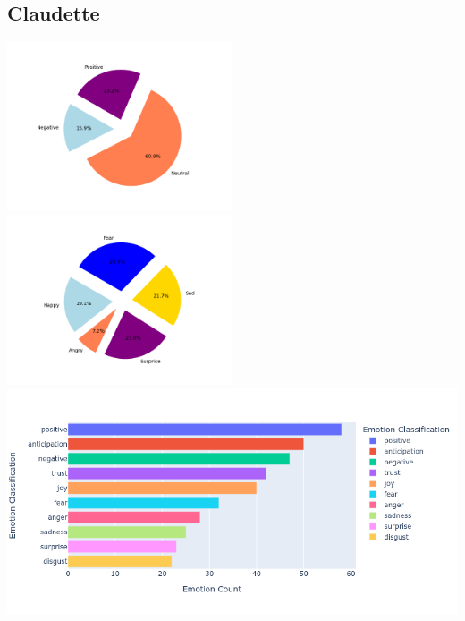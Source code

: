 \documentclass[a4paper,12pt]{article}
\begin{document}
	\subsection{Claudette}
	{\includegraphics[height=5cm]{claudettesVaderEmotionalPie.png}}
	{\includegraphics[height=5cm]{claudettesEmotionalPie.png}}\\
	{\includegraphics[width=17cm]{claudetteNrcImage.png}}\\
	\clearpage
\end{document}

